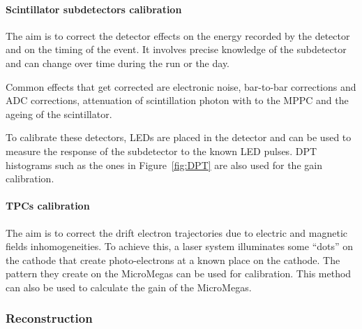 \paragraph{Scintillator subdetectors calibration}
The aim is to correct the detector effects on the energy recorded by
the detector and on the timing of the event. It involves precise
knowledge of the subdetector and can change over time during the run
or the day.

Common effects that get corrected are electronic noise, bar-to-bar
corrections and \Gls{ADC} corrections, attenuation of scintillation
photon with to the \Gls{MPPC} and the ageing of the scintillator.

To calibrate these detectors, LEDs are placed in the detector and can
be used to measure the response of the subdetector to the known LED
pulses. \Gls{DPT} histograms such as the ones in Figure~\ref{fig:DPT}
are also used for the gain calibration.

\paragraph{TPCs calibration}
The aim is to correct the drift electron trajectories due to electric
and magnetic fields inhomogeneities. To achieve this, a laser system
illuminates some ``dots'' on the cathode that create photo-electrons
at a known place on the cathode. The pattern they create on the
MicroMegas can be used for calibration. This method can also be used
to calculate the gain of the MicroMegas.

\subsubsection{Reconstruction}
\label{subsubsec:reconstruction}

